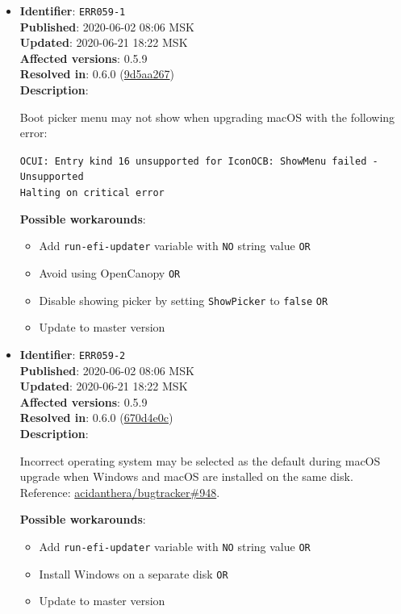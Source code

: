 \documentclass[]{article}
\providecommand{\tightlist}{%
  \setlength{\itemsep}{0pt}\setlength{\parskip}{0pt}}
\begin{document}
\begin{itemize}
\item
  \textbf{Identifier}: \texttt{ERR059-1} \\
  \textbf{Published}: 2020-06-02 08:06 MSK \\
  \textbf{Updated}: 2020-06-21 18:22 MSK \\
  \textbf{Affected versions}: 0.5.9 \\
  \textbf{Resolved in}: 0.6.0 (\href{https://github.com/acidanthera/OpenCorePkg/commit/9d5aa267a9133fd9390b62012c21428fc77681f2}{9d5aa267}) \\
  \textbf{Description}:

  Boot picker menu may not show when upgrading macOS with the following error:

\texttt{OCUI﻿: Ent﻿ry kind 16 unsupported for Icon﻿OCB: ShowMenu failed - Unsupported﻿﻿}\\
\texttt{Halting on critical error﻿}

  \textbf{Possible workarounds}:
  \begin{itemize}
    \tightlist
    \item Add \texttt{run-efi-updater} variable with \texttt{NO} string value \texttt{OR}
    \item Avoid using OpenCanopy \texttt{OR}
    \item Disable showing picker by setting \texttt{ShowPicker} to \texttt{false} \texttt{OR}
    \item Update to master version
  \end{itemize}


\item
  \textbf{Identifier}: \texttt{ERR059-2} \\
  \textbf{Published}: 2020-06-02 08:06 MSK \\
  \textbf{Updated}: 2020-06-21 18:22 MSK \\
  \textbf{Affected versions}: 0.5.9 \\
  \textbf{Resolved in}: 0.6.0 (\href{https://github.com/acidanthera/OpenCorePkg/commit/670d4e0c4f8538268367d16fc3ddef9b2ed13d46}{670d4e0c}) \\
  \textbf{Description}:

  Incorrect operating system may be selected as the default during macOS upgrade when
  Windows and macOS are installed on the same disk. Reference:
  \href{https://github.com/acidanthera/bugtracker/issues/948}{acidanthera/bugtracker\#948}.

  \textbf{Possible workarounds}:
  \begin{itemize}
    \tightlist
    \item Add \texttt{run-efi-updater} variable with \texttt{NO} string value \texttt{OR}
    \item Install Windows on a separate disk \texttt{OR}
    \item Update to master version
  \end{itemize}



\end{itemize}
\end{document}
